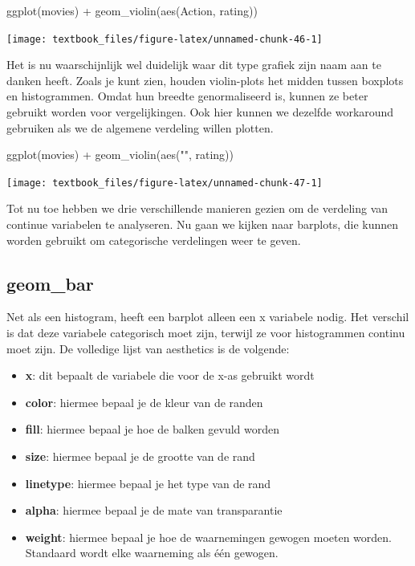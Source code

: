\documentclass[]{tufte-book}
\newenvironment{Shaded}{}{}
\newcommand{\FunctionTok}[1]{\textcolor[rgb]{0.02,0.16,0.49}{#1}}
\newcommand{\NormalTok}[1]{#1}
\newcommand{\SpecialCharTok}[1]{\textcolor[rgb]{0.25,0.44,0.63}{#1}}
\newcommand{\StringTok}[1]{\textcolor[rgb]{0.25,0.44,0.63}{#1}}
\providecommand{\tightlist}{%
  \setlength{\itemsep}{0pt}\setlength{\parskip}{0pt}}
\begin{document}
\begin{Shaded}
\begin{Highlighting}[]
\FunctionTok{ggplot}\NormalTok{(movies) }\SpecialCharTok{+}
  \FunctionTok{geom\_violin}\NormalTok{(}\FunctionTok{aes}\NormalTok{(Action, rating))}
\end{Highlighting}
\end{Shaded}

\texttt{[image: textbook\_files/figure-latex/unnamed-chunk-46-1]}

Het is nu waarschijnlijk wel duidelijk waar dit type grafiek zijn naam aan te danken heeft. Zoals je kunt zien, houden violin-plots het midden tussen boxplots en histogrammen. Omdat hun breedte genormaliseerd is, kunnen ze beter gebruikt worden voor vergelijkingen. Ook hier kunnen we dezelfde workaround gebruiken als we de algemene verdeling willen plotten.

\begin{Shaded}
\begin{Highlighting}[]
\FunctionTok{ggplot}\NormalTok{(movies) }\SpecialCharTok{+}
  \FunctionTok{geom\_violin}\NormalTok{(}\FunctionTok{aes}\NormalTok{(}\StringTok{""}\NormalTok{, rating))}
\end{Highlighting}
\end{Shaded}

\texttt{[image: textbook\_files/figure-latex/unnamed-chunk-47-1]}

Tot nu toe hebben we drie verschillende manieren gezien om de verdeling van continue variabelen te analyseren. Nu gaan we kijken naar barplots, die kunnen worden gebruikt om categorische verdelingen weer te geven.

\hypertarget{geom_bar}{%
\subsection{geom\_bar}\label{geom_bar}}

Net als een histogram, heeft een barplot alleen een x variabele nodig. Het verschil is dat deze variabele categorisch moet zijn, terwijl ze voor histogrammen continu moet zijn. De volledige lijst van aesthetics is de volgende:

\begin{itemize}
\tightlist
\item
  \textbf{x}: dit bepaalt de variabele die voor de x-as gebruikt wordt
\item
  \textbf{color}: hiermee bepaal je de kleur van de randen
\item
  \textbf{fill}: hiermee bepaal je hoe de balken gevuld worden
\item
  \textbf{size}: hiermee bepaal je de grootte van de rand
\item
  \textbf{linetype}: hiermee bepaal je het type van de rand
\item
  \textbf{alpha}: hiermee bepaal je de mate van transparantie
\item
  \textbf{weight}: hiermee bepaal je hoe de waarnemingen gewogen moeten worden. Standaard wordt elke waarneming als één gewogen.
\end{itemize}
\end{document}
